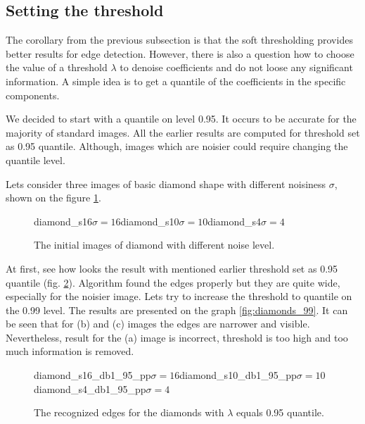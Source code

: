 
\subsection{Setting the threshold}
The corollary from the previous subsection is that the soft thresholding provides better results for edge detection. However, there is also a question how to choose the value of a threshold $\lambda$ to denoise coefficients and do not loose any significant information. A simple idea is to get a quantile of the coefficients in the specific components.

We decided to start with a quantile on level 0.95. It occurs to be accurate for the majority of standard images. All the earlier results are computed for threshold set as 0.95 quantile. Although, images which are noisier could require changing the quantile level.

Lets consider three images of basic diamond shape with different noisiness $\sigma$, shown on the figure \ref{fig:diamonds}.

\begin{figure}[h]
	\begin{subdiagrams3}{diamond_s16}{$\sigma=16$}{diamond_s10}{$\sigma=10$}{diamond_s4}{$\sigma=4$}
	\end{subdiagrams3}
	\centering
	\caption{The initial images of diamond with different noise level.}
	\label{fig:diamonds}
\end{figure}

At first, see how looks the result with mentioned earlier threshold set as 0.95 quantile (fig. \ref{fig:diamonds_95}). Algorithm found the edges properly but they are quite wide, especially for the noisier image. Lets try to increase the threshold to quantile on the 0.99 level. The results are presented on the graph \ref{fig:diamonds_99}. It can be seen that for (b) and (c) images the edges are narrower and visible. Nevertheless, result for the (a) image is incorrect, threshold is too high and too much information is removed.

\begin{figure}[h]
	\begin{subdiagrams3}{diamond_s16_db1_95_pp}{$\sigma=16$}{diamond_s10_db1_95_pp}{$\sigma=10$}{diamond_s4_db1_95_pp}{$\sigma=4$}
	\end{subdiagrams3}
	\centering
	\caption{The recognized edges for the diamonds with $\lambda$ equals 0.95 quantile.}
	\label{fig:diamonds_95}
\end{figure}

